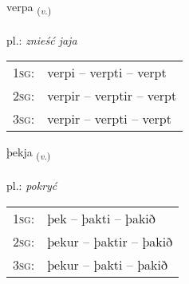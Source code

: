 \documentclass[frontgrid, backgrid]{flacards}\usepackage[]{graphicx}\usepackage[]{xcolor}
\begin{document}
\renewcommand{\flhead}{\vskip5pt \fboxsep=0pt {\small\bfseries\footnotesize Sagnorð | czasownik}}
\renewcommand{\fcfoot}{\vskip5pt \fboxsep=0pt \hspace{2pt}{\small\bfseries\footnotesize 3K}}

\renewcommand{\blhead}{\vskip5pt {\small\bfseries\footnotesize Sagnorð | czasownik }}
\renewcommand{\bcfoot}{\vskip5pt \hspace{2pt}{\small\bfseries\footnotesize 3K}}


{verpa \small{\textsubscript{(\textit{v.})}} \\[1ex] %
\textphonetic{[vɛr̥pa]} \\
pl.: \emph{znieść jaja} \\  [2ex]
\renewcommand*{\arraystretch}{0.8}
\begin{tabular}{p{1cm}l}
\textsc{1sg}: & verpi -- verpti -- verpt \\ 
\textsc{2sg}: & verpir -- verptir -- verpt \\ 
\textsc{3sg}: & verpir -- verpti -- verpt \\ 
\end{tabular}
}

\renewcommand{\flhead}{\vskip5pt \fboxsep=0pt {\small\bfseries\footnotesize Sagnorð | czasownik}}
\renewcommand{\fcfoot}{\vskip5pt \fboxsep=0pt \hspace{2pt}{\small\bfseries\footnotesize 3K}}

\renewcommand{\blhead}{\vskip5pt {\small\bfseries\footnotesize Sagnorð | czasownik }}
\renewcommand{\bcfoot}{\vskip5pt \hspace{2pt}{\small\bfseries\footnotesize 3K}}


{þekja \small{\textsubscript{(\textit{v.})}} \\[1ex] %
\textphonetic{[θɛːca]} \\
pl.: \emph{pokryć} \\  [2ex]
\renewcommand*{\arraystretch}{0.8}
\begin{tabular}{p{1cm}l}
\textsc{1sg}: & þek -- þakti -- þakið \\ 
\textsc{2sg}: & þekur -- þaktir -- þakið \\ 
\textsc{3sg}: & þekur -- þakti -- þakið \\ 
\end{tabular}
}
\end{document}
